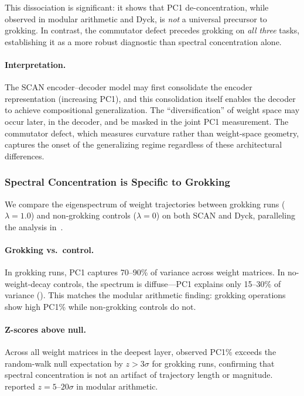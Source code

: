 \documentclass[11pt]{article}
\begin{document}
This dissociation is significant: it shows that PC1 de-concentration, while observed in modular arithmetic and Dyck, is \emph{not} a universal precursor to grokking. In contrast, the commutator defect precedes grokking on \emph{all three} tasks, establishing it as a more robust diagnostic than spectral concentration alone.

\paragraph{Interpretation.} The SCAN encoder--decoder model may first consolidate the encoder representation (increasing PC1), and this consolidation itself enables the decoder to achieve compositional generalization. The ``diversification'' of weight space may occur later, in the decoder, and be masked in the joint PC1 measurement. The commutator defect, which measures curvature rather than weight-space geometry, captures the onset of the generalizing regime regardless of these architectural differences.

\subsubsection{Spectral Concentration is Specific to Grokking}
\label{sec:spectral}

We compare the eigenspectrum of weight trajectories between grokking runs ($\lambda = 1.0$) and non-grokking controls ($\lambda = 0$) on both SCAN and Dyck, paralleling the analysis in~\citet{xu2026integrability}.

\paragraph{Grokking vs.\ control.} In grokking runs, PC1 captures 70--90\% of variance across weight matrices. In no-weight-decay controls, the spectrum is diffuse---PC1 explains only 15--30\% of variance (). This matches the modular arithmetic finding: grokking operations show high PC1\% while non-grokking controls do not.

\paragraph{Z-scores above null.} Across all weight matrices in the deepest layer, observed PC1\% exceeds the random-walk null expectation by $z > 3\sigma$ for grokking runs, confirming that spectral concentration is not an artifact of trajectory length or magnitude. \citet{xu2026integrability} reported $z = 5$--$20\sigma$ in modular arithmetic.
\end{document}
